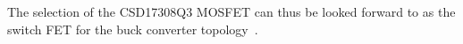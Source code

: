 The selection of the CSD17308Q3 MOSFET can thus be looked forward to as the switch FET for the buck converter topology~\cite{LTC4012,CSD17308Q3,Si7212DN}.









